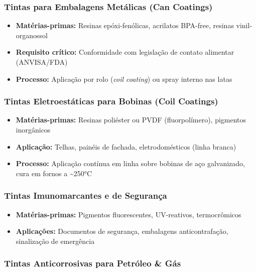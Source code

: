 \documentclass[
  12pt,
  a4paper,
  oneside,
  brazil,
  chapter=TITLE
]{article}
\begin{document}
\subsubsection{Tintas para Embalagens Metálicas (Can
Coatings)}\label{tintas-para-embalagens-metuxe1licas-can-coatings}

\begin{itemize}
\tightlist
\item
  \textbf{Matérias-primas:} Resinas epóxi-fenólicas, acrilatos BPA-free,
  resinas vinil-organossol
\item
  \textbf{Requisito crítico:} Conformidade com legislação de contato
  alimentar (ANVISA/FDA)
\item
  \textbf{Processo:} Aplicação por rolo (\emph{coil coating}) ou spray
  interno nas latas
\end{itemize}

\subsubsection{Tintas Eletroestáticas para Bobinas (Coil
Coatings)}\label{tintas-eletroestuxe1ticas-para-bobinas-coil-coatings}

\begin{itemize}
\tightlist
\item
  \textbf{Matérias-primas:} Resinas poliéster ou PVDF (fluorpolímero),
  pigmentos inorgânicos
\item
  \textbf{Aplicação:} Telhas, painéis de fachada, eletrodomésticos
  (linha branca)
\item
  \textbf{Processo:} Aplicação contínua em linha sobre bobinas de aço
  galvanizado, cura em fornos a \textasciitilde250°C
\end{itemize}

\subsubsection{Tintas Imunomarcantes e de
Segurança}\label{tintas-imunomarcantes-e-de-seguranuxe7a}

\begin{itemize}
\tightlist
\item
  \textbf{Matérias-primas:} Pigmentos fluorescentes, UV-reativos,
  termocrômicos
\item
  \textbf{Aplicações:} Documentos de segurança, embalagens
  anticontrafação, sinalização de emergência
\end{itemize}

\subsubsection{Tintas Anticorrosivas para Petróleo \& Gás}\label{tintas-anticorrosivas-para-petruxf3leo-guxe1s}
\end{document}
